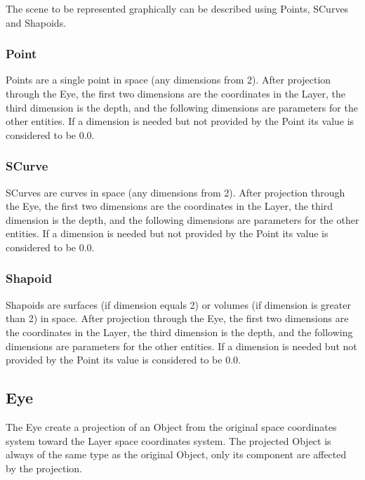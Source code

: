 The scene to be represented graphically can be described using Points, SCurves and Shapoids.\\

\subsubsection{Point}

Points are a single point in space (any dimensions from 2). After projection through the Eye, the first two dimensions are the coordinates in the Layer, the third dimension is the depth, and the following dimensions are parameters for the other entities. If a dimension is needed but not provided by the Point its value is considered to be 0.0.\\

\subsubsection{SCurve}

SCurves are curves in space (any dimensions from 2). After projection through the Eye, the first two dimensions are the coordinates in the Layer, the third dimension is the depth, and the following dimensions are parameters for the other entities. If a dimension is needed but not provided by the Point its value is considered to be 0.0.\\

\subsubsection{Shapoid}

Shapoids are surfaces (if dimension equals 2) or volumes (if dimension is greater than 2) in space. After projection through the Eye, the first two dimensions are the coordinates in the Layer, the third dimension is the depth, and the following dimensions are parameters for the other entities. If a dimension is needed but not provided by the Point its value is considered to be 0.0.\\

\subsection{Eye}

The Eye create a projection of an Object from the original space coordinates system toward the Layer space coordinates system. The projected Object is always of the same type as the original Object, only its component are affected by the projection.\\

